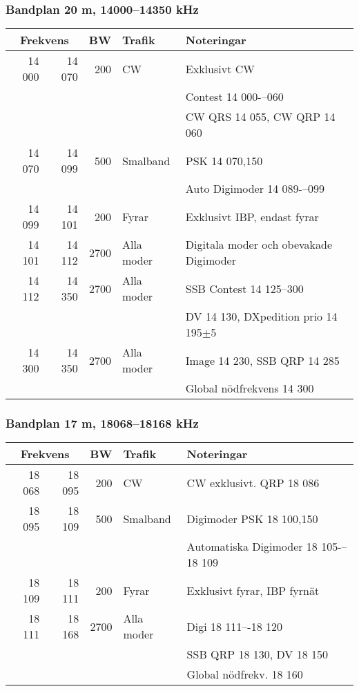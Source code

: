 \begin{landscape}
\subsubsection{Bandplan 20 m, 14000--14350 kHz}
\begin{tabular}{rrrll}
\multicolumn{2}{c}{\textbf{Frekvens}} & \textbf{BW} & \textbf{Trafik} & \textbf{Noteringar} \\ \hline
14 000 & 14 070 & 200  & CW         & Exklusivt CW                            \\
       &        &      &            & Contest 14 000-–060                     \\
       &        &      &            & CW QRS 14 055, CW QRP 14 060            \\ \hline
14 070 & 14 099 & 500  & Smalband   & PSK 14 070,150                          \\
       &        &      &            & Auto Digimoder 14 089-–099              \\ \hline
14 099 & 14 101 & 200  & Fyrar      & Exklusivt IBP, endast fyrar             \\ \hline
14 101 & 14 112 & 2700 & Alla moder & Digitala moder och obevakade Digimoder  \\ \hline
14 112 & 14 350 & 2700 & Alla moder & SSB Contest 14 125--300                 \\
       &        &      &            & DV 14 130, DXpedition prio 14 195$\pm$5 \\ \hline
14 300 & 14 350 & 2700 & Alla moder & Image 14 230, SSB QRP 14 285            \\
       &        &      &            & Global nödfrekvens 14 300               \\ \hline
\end{tabular}

\subsubsection{Bandplan 17 m, 18068--18168 kHz}
\begin{tabular}{rrrll}
\multicolumn{2}{c}{\textbf{Frekvens}} & \textbf{BW} & \textbf{Trafik} & \textbf{Noteringar} \\ \hline
18 068 & 18 095 & 200  & CW         & CW exklusivt. QRP 18 086             \\ \hline
18 095 & 18 109 & 500  & Smalband   & Digimoder PSK 18 100,150             \\
       &        &      &            & Automatiska Digimoder 18 105-–18 109 \\ \hline
18 109 & 18 111 & 200  & Fyrar      & Exklusivt fyrar, IBP fyrnät          \\ \hline
18 111 & 18 168 & 2700 & Alla moder & Digi 18 111–-18 120                  \\
       &        &      &            & SSB QRP 18 130, DV 18 150            \\
       &        &      &            & Global nödfrekv. 18 160\\ \hline
\end{tabular}


\end{landscape}
